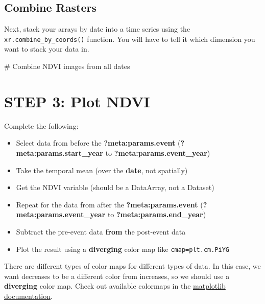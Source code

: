 \documentclass[
  letterpaper,
  DIV=11,
  numbers=noendperiod,
  oneside]{scrreprt}
\newenvironment{Shaded}{\begin{snugshade}}{\end{snugshade}}
\newcommand{\CommentTok}[1]{\textcolor[rgb]{0.37,0.37,0.37}{#1}}
\providecommand{\tightlist}{%
  \setlength{\itemsep}{0pt}\setlength{\parskip}{0pt}}
\begin{document}
\section{Combine Rasters}\label{combine-rasters}

Next, stack your arrays by date into a time series using the
\texttt{xr.combine\_by\_coords()} function. You will have to tell it
which dimension you want to stack your data in.

\begin{Shaded}
\begin{Highlighting}[]
\CommentTok{\# Combine NDVI images from all dates}
\end{Highlighting}
\end{Shaded}


\chapter{STEP 3: Plot NDVI}\label{step-3-plot-ndvi}

\begin{tcolorbox}[enhanced jigsaw, colbacktitle=quarto-callout-color!10!white, opacityback=0, bottomtitle=1mm, toptitle=1mm, bottomrule=.15mm, left=2mm, colframe=quarto-callout-color-frame, leftrule=.75mm, opacitybacktitle=0.6, colback=white, rightrule=.15mm, toprule=.15mm, breakable, titlerule=0mm, title=\textcolor{quarto-callout-color}{\faInfo}\hspace{0.5em}{Try It: Plot the change in NDVI spatially}, coltitle=black, arc=.35mm]

Complete the following:

\begin{itemize}
\tightlist
\item
  Select data from before the \textbf{?meta:params.event}
  (\textbf{?meta:params.start\_year} to
  \textbf{?meta:params.event\_year})
\item
  Take the temporal mean (over the \textbf{date}, not spatially)
\item
  Get the NDVI variable (should be a DataArray, not a Dataset)
\item
  Repeat for the data from after the \textbf{?meta:params.event}
  (\textbf{?meta:params.event\_year} to \textbf{?meta:params.end\_year})
\item
  Subtract the pre-event data \textbf{from} the post-event data
\item
  Plot the result using a \textbf{diverging} color map like
  \texttt{cmap=plt.cm.PiYG}
\end{itemize}

There are different types of color maps for different types of data. In
this case, we want decreases to be a different color from increases, so
we should use a \textbf{diverging} color map. Check out available
colormaps in the
\href{https://matplotlib.org/stable/tutorials/colors/colormaps.html}{matplotlib
documentation}.

\end{tcolorbox}
\end{document}
